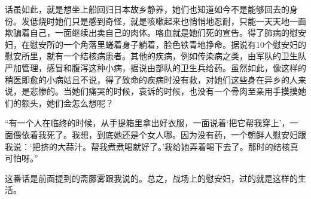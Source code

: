 \documentclass[12pt,UTF8]{ctexbook}
\begin{document}
话虽如此，就是想坐上船回归日本故乡静养，她们也知道如今不是能够回去的身份。发低烧时她们只是感到奇怪，就是咳嗽起来也悄悄地忍耐，只能一天天地一面欺骗着自己，一面继续出卖自己的肉体。咯血就是她们死的宣告。得了肺病的慰安妇，在慰安所的一个角落里蜷着身子躺着，脸色铁青地挣命。据说有10个慰安妇的慰安所里，就有一个结核病患者。其他的疾病，例如传染病之类，由军队的卫生队严加管理，感冒和腹泻这种小病，据说由部队的卫生兵给药。虽然如此，像这样的稍医即愈的小病姑且不说，得了致命的疾病时没有救，对她们这些身在异乡的人来说，是悲惨的。当她们痛哭的时候，哀诉的时候，也没有一个骨肉至亲用手摸摸她们的额头，她们会怎么想呢？

“有一个人在临终的时候，从手提箱里拿出好衣服，一面说着‘把它帮我穿上’，一面偎依着我死了。我想，到底她还是个女人哪。因为没有药，一个朝鲜人慰安妇跟我说：‘把挤的大蒜汁。帮我煮煮喝就好了。’我给她弄着喝下去了。那时的结核真可怕呀。”

这番话是前面提到的斋藤雾跟我说的。总之，战场上的慰安妇，过的就是这样的生活。

\backmatter
\end{document}
